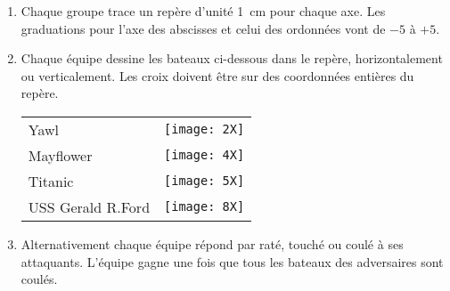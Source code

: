 \begin{TP}

\begin{enumerate}
 \item Chaque groupe trace un repère d'unité 1 cm pour chaque axe. Les graduations pour l'axe des abscisses et celui des ordonnées vont de $- 5$ à $+ 5$.
 \item Chaque équipe dessine les bateaux ci-dessous dans le repère, horizontalement ou verticalement. Les croix doivent être sur des coordonnées entières du repère. \\[0.5em]
\begin{tabularx}{\linewidth}{XX}
 
 Yawl & \texttt{[image: 2X]} \\
 Mayflower & \texttt{[image: 4X]} \\
 Titanic & \texttt{[image: 5X]} \\
 USS Gerald R.Ford & \texttt{[image: 8X]} \\
 \end{tabularx}
 \vspace{0.3cm}
 \item Alternativement chaque équipe répond par raté, touché ou coulé à ses attaquants. L'équipe gagne une fois que tous les bateaux des adversaires sont coulés.
 \end{enumerate}
 
\end{TP}

